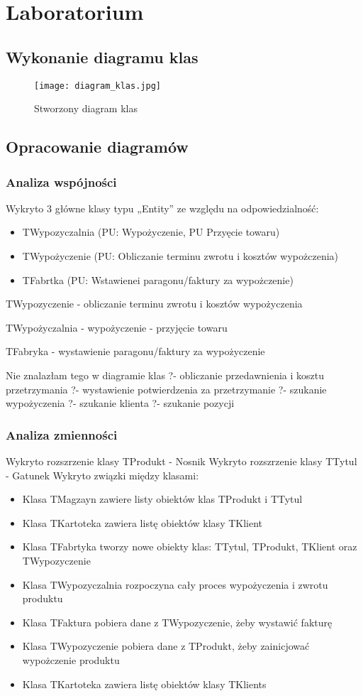 \documentclass{article}
\begin{document}
	\section{Laboratorium}
	\subsection{Wykonanie diagramu klas}
\begin{figure}[!ht]
	\centering
	\texttt{[image: diagram\_klas.jpg]}
	\caption{Stworzony diagram klas}
	\label{fig:obrazek 1}
\end{figure}
	\newpage
	\subsection{Opracowanie diagramów}
	\subsubsection{Analiza wspójności}
	Wykryto 3 główne klasy typu „Entity” ze względu na odpowiedzialność:
	\begin{itemize}
	\item TWypozyczalnia (PU: Wypożyczenie, PU Przyęcie towaru)
	\item TWypożyczenie (PU: Obliczanie terminu zwrotu i kosztów wypożczenia)
	\item TFabrtka (PU: Wstawienei paragonu/faktury za wypożczenie)
	\end{itemize}	
TWypozyczenie
- obliczanie terminu zwrotu i kosztów wypożyczenia

TWypożyczalnia
- wypożyczenie
- przyjęcie towaru

TFabryka
- wystawienie paragonu/faktury za wypożyczenie

Nie znalazłam tego w diagramie klas
?- obliczanie przedawnienia i kosztu przetrzymania
?- wystawienie potwierdzenia za przetrzymanie
?- szukanie wypożyczenia
?- szukanie klienta
?- szukanie pozycji
\subsubsection{Analiza zmienności}
Wykryto rozszrzenie klasy TProdukt - Nosnik
Wykryto rozszrzenie klasy TTytul - Gatunek
Wykryto związki między klasami:
\begin{itemize}
	\item Klasa TMagzayn zawiere listy obiektów klas TProdukt i TTytul
	\item Klasa TKartoteka zawiera listę obiektów klasy TKlient
	\item Klasa TFabrtyka tworzy nowe obiekty klas: TTytul, TProdukt, TKlient oraz TWypozyczenie
	\item Klasa TWypozyczalnia rozpoczyna cały proces wypożyczenia i zwrotu produktu
	\item Klasa TFaktura pobiera dane z TWypozyczenie, żeby wystawić fakturę
	\item Klasa TWypozyczenie pobiera dane z TProdukt, żeby zainicjować wypożczenie produktu
	\item Klasa TKartoteka zawiera listę obiektów klasy TKlients
\end{itemize}	
\end{document}
